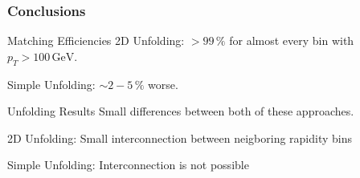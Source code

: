 \documentclass[compress]{beamer}
\begin{document}

\begin{frame}
\frametitle{Conclusions}
\begin{block}{Matching Efficiencies}
  2D Unfolding: $> 99\,\%$ for almost every bin with $p_T>100\,\text{GeV}$.

  Simple Unfolding: $\sim 2-5\,\%$ worse.
\end{block}
\begin{block}{Unfolding Results}
  Small differences between both of these approaches.

  2D Unfolding: Small interconnection between neigboring rapidity bins

  Simple Unfolding: Interconnection is not possible
\end{block}
\end{frame}
\end{document}
